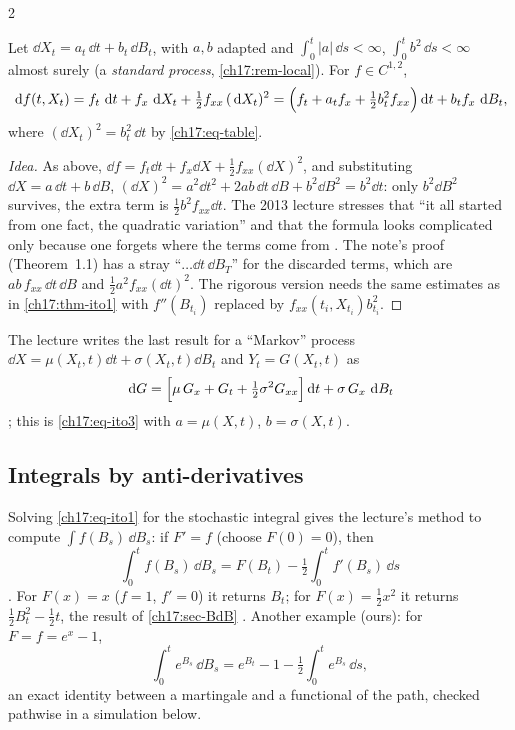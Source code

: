 \begin{paracol}{2}
\begin{theorem}\label{ch17:thm-ito3}
Let $\dd X_t=a_t\,\dd t+b_t\,\dd B_t$, with $a,b$ adapted and $\int_0^t|a|\,\dd s<\infty$, $\int_0^tb^2\,\dd s<\infty$ almost surely (a \emph{standard process}, \cref{ch17:rem-local}). For $f\in C^{1,2}$,
\begin{equation}\label{ch17:eq-ito3}
  \,\mathrm{d} f(t,X_t)=f_t\,\,\mathrm{d} t+f_x\,\,\mathrm{d} X_t+\tfrac12f_{xx}\,(\,\mathrm{d} X_t)^2=\Bigl(f_t+a_tf_x+\tfrac12b_t^2f_{xx}\Bigr)\,\mathrm{d} t+b_tf_x\,\,\mathrm{d} B_t ,
\end{equation}
where $(\dd X_t)^2=b_t^2\,\dd t$ by \eqref{ch17:eq-table}.
\end{theorem}
\begin{proof}[Idea]
As above, $\dd f=f_t\dd t+f_x\dd X+\tfrac12f_{xx}(\dd X)^2$, and substituting $\dd X=a\,\dd t+b\,\dd B$,
$(\dd X)^2=a^2\dd t^2+2ab\,\dd t\,\dd B+b^2\dd B^2=b^2\dd t$: only $b^2\dd B^2$ survives, the extra term is $\tfrac12b^2f_{xx}\dd t$. The 2013 lecture stresses that ``it all started from one fact, the quadratic variation'' and
that the formula looks complicated only because one forgets where the terms come from .
The note's proof (Theorem~1.1) has a stray ``$\dots\dd t\,\dd B_T$'' for the discarded terms, which are $ab\,f_{xx}\,\dd t\,\dd B$ and $\tfrac12a^2f_{xx}(\dd t)^2$.
The rigorous version needs the same estimates as in \cref{ch17:thm-ito1} with $f''(B_{t_i})$ replaced by $f_{xx}(t_i,X_{t_i})b_{t_i}^2$.
\end{proof}

The lecture writes the last result for a ``Markov'' process $\dd X=\mu(X_t,t)\dd t+\sigma(X_t,t)\dd B_t$ and $Y_t=G(X_t,t)$ as
\[
  \,\mathrm{d} G=\Bigl[\mu\,G_x+G_t+\tfrac12\sigma^2G_{xx}\Bigr]\,\mathrm{d} t+\sigma\,G_x\,\,\mathrm{d} B_t
\]
; this is \eqref{ch17:eq-ito3} with $a=\mu(X,t)$, $b=\sigma(X,t)$.

\subsection{Integrals by anti-derivatives}\label{ch17:sec-antider}
Solving \eqref{ch17:eq-ito1} for the stochastic integral gives the lecture's method to compute $\int f(B_s)\,\dd B_s$: if $F'=f$ (choose $F(0)=0$), then
\begin{equation}\label{ch17:eq-antider}
  \int_0^tf(B_s)\,\dd B_s=F(B_t)-\tfrac12\int_0^tf'(B_s)\,\dd s
\end{equation}
. For $F(x)=x$ ($f=1$, $f'=0$) it returns $B_t$; for $F(x)=\tfrac12x^2$ it returns $\tfrac12B_t^2-\tfrac12t$, the result of \cref{ch17:sec-BdB}
. Another example (ours): for $F=f=e^x-1$,
\[
  \int_0^te^{B_s}\,\dd B_s=e^{B_t}-1-\tfrac12\int_0^te^{B_s}\,\dd s ,
\]
an exact identity between a martingale and a functional of the path, checked pathwise in a simulation below.


\end{paracol}
